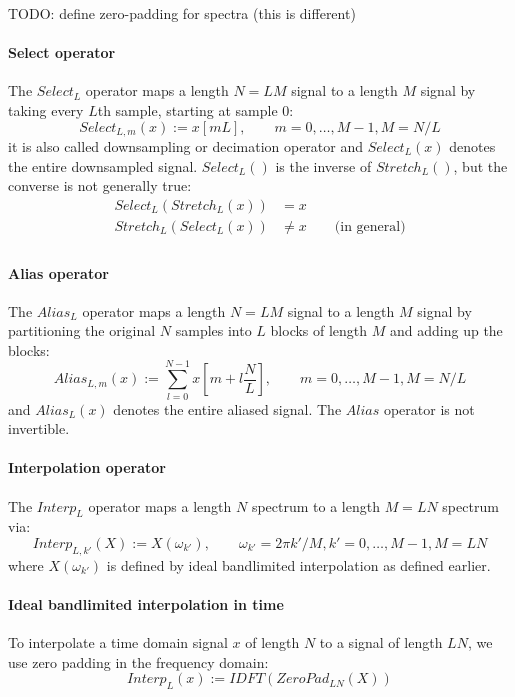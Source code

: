 TODO: define zero-padding for spectra (this is different)

\paragraph{Select operator}
The $Select_L$ operator maps a length $N=LM$ signal to a length $M$ signal by taking every $L$th sample, starting at sample $0$:
\begin{equation}
  Select_{L,m}(x) := x[mL], \qquad m=0,\ldots,M-1, M=N/L
\end{equation}
it is also called downsampling or decimation operator and $Select_L(x)$ denotes the entire downsampled signal. $Select_L()$ is the inverse of $Stretch_L()$, but the converse is not generally true:
\begin{equation}
 \begin{aligned}
  Select_L(  Stretch_L (x) ) &=    x  \\
  Stretch_L( Select_L  (x) ) &\neq x \qquad \text{(in general)}  \\
 \end{aligned}
\end{equation}

\paragraph{Alias operator}
The $Alias_L$ operator maps a length $N=LM$ signal to a length $M$ signal by partitioning the original $N$ samples into $L$ blocks of length $M$ and adding up the blocks:
\begin{equation}
  Alias_{L,m}(x) :=  \sum_{l=0}^{N-1} x\left[m + l\frac{N}{L} \right], \qquad m=0,\ldots,M-1, M=N/L
\end{equation}
and $Alias_L(x)$ denotes the entire aliased signal. The $Alias$ operator is not invertible.

\paragraph{Interpolation operator}
The $Interp_L$ operator maps a length $N$ spectrum to a length $M=LN$ spectrum via:
\begin{equation}
  Interp_{L,k'}(X) :=  X(\omega_{k'}), \qquad \omega_{k'} = 2 \pi k' / M, k' = 0, \ldots, M-1, M=LN
\end{equation}
where $X(\omega_{k'})$ is defined by ideal bandlimited interpolation as defined earlier.

\paragraph{Ideal bandlimited interpolation in time}
To interpolate a time domain signal $x$ of length $N$ to a signal of length $LN$, we use zero padding in the frequency domain:
\begin{equation}
 Interp_L(x) :=  IDFT( ZeroPad_{LN}(X) )
\end{equation}

